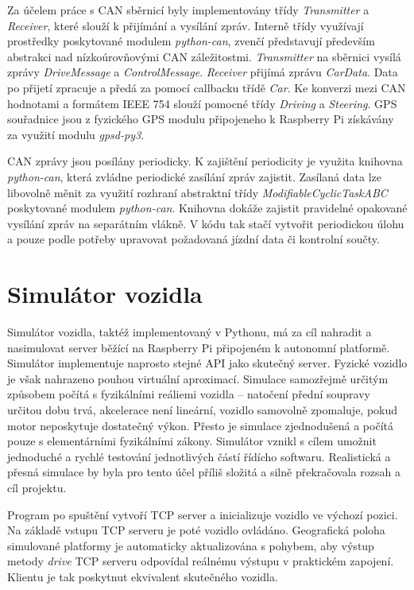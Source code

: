 \documentclass[czech, bachelor]{diploma}
\begin{document}
Za účelem práce s CAN sběrnicí byly implementovány třídy \emph{Transmitter} a \emph{Receiver}, které slouží k přijímání a vysílání
zpráv. Interně třídy využívají prostředky poskytované modulem \emph{python-can}, zvenčí představují především abstrakci
nad nízkoúrovňovými CAN záležitostmi. \emph{Transmitter} na sběrnici vysílá zprávy \emph{DriveMessage} a \emph{ControlMessage}.
\emph{Receiver} přijímá zprávu \emph{CarData}. Data po přijetí zpracuje a předá za pomocí callbacku třídě \emph{Car}. Ke konverzi
mezi CAN hodnotami a formátem IEEE 754 slouží pomocné třídy \emph{Driving} a \emph{Steering}. GPS souřadnice jsou z fyzického GPS
modulu připojeneho k Raspberry Pi získávány za využití modulu \emph{gpsd-py3}.

CAN zprávy jsou posílány periodicky. K zajištění periodicity je využita knihovna \emph{python-can}, která zvládne periodické
zasílání zpráv zajistit. Zasílaná data lze libovolně měnit za využití rozhraní abstraktní třídy \emph{ModifiableCyclicTaskABC}
poskytované modulem \emph{python-can}. Knihovna dokáže zajistit pravidelné opakované vysílání zpráv na separátním vlákně. V kódu
tak stačí vytvořit periodickou úlohu a pouze podle potřeby upravovat požadovaná jízdní data či kontrolní součty.

\chapter{Simulátor vozidla}

Simulátor vozidla, taktéž implementovaný v Pythonu, má za cíl nahradit a nasimulovat server běžící na Raspberry Pi připojeném
k autonomní platformě. Simulátor implementuje naprosto stejné API jako skutečný server. Fyzické vozidlo je však nahrazeno pouhou
virtuální aproximací. Simulace samozřejmě určitým způsobem počítá s fyzikálními reáliemi vozidla -- natočení přední soupravy
určitou dobu trvá, akcelerace není lineární, vozidlo samovolně zpomaluje, pokud motor neposkytuje dostatečný výkon. Přesto je
simulace zjednodušená a počítá pouze s elementárními fyzikálními zákony. Simulátor vznikl s cílem umožnit jednoduché a rychlé
testování jednotlivých částí řídícho softwaru. Realistická a přesná simulace by byla pro tento účel příliš složitá a silně
překračovala rozsah a cíl projektu.

Program po spuštění vytvoří TCP server a inicializuje vozidlo ve výchozí pozici. Na základě vstupu TCP serveru je poté vozidlo
ovládáno. Geografická poloha simulované platformy je automaticky aktualizována s pohybem, aby výstup metody \emph{drive} TCP
serveru odpovídal reálnému výstupu v praktickém zapojení. Klientu je tak poskytnut ekvivalent skutečného vozidla.
\end{document}
